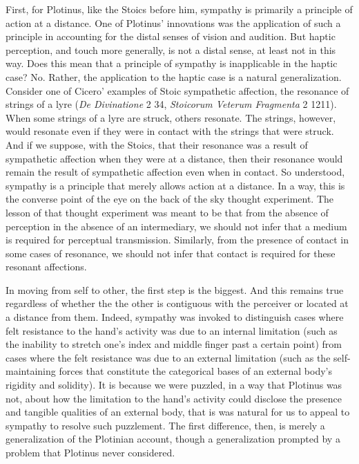 First, for Plotinus, like the Stoics before him, sympathy is primarily a principle of action at a distance. One of Plotinus' innovations was the application of such a principle in accounting for the distal senses of vision and audition. But haptic perception, and touch more generally, is not a distal sense, at least not in this way. Does this mean that a principle of sympathy is inapplicable in the haptic case? No. Rather, the application to the haptic case is a natural generalization. Consider one of Cicero' examples of Stoic sympathetic affection, the resonance of strings of a lyre (\emph{De Divinatione} 2 34, \emph{Stoicorum Veterum Fragmenta} 2 1211). When some strings of a lyre are struck, others resonate. The strings, however, would resonate even if they were in contact with the strings that were struck. And if we suppose, with the Stoics, that their resonance was a result of sympathetic affection when they were at a distance, then their resonance would remain the result of sympathetic affection even when in contact. So understood, sympathy is a principle that merely allows action at a distance. In a way, this is the converse point of the eye on the back of the sky thought experiment. The lesson of that thought experiment was meant to be that from the absence of perception in the absence of an intermediary, we should not infer that a medium is required for perceptual transmission. Similarly, from the presence of contact in some cases of resonance, we should not infer that contact is required for these resonant affections.

In moving from self to other, the first step is the biggest. And this remains true regardless of whether the the other is contiguous with the perceiver or located at a distance from them. Indeed, sympathy was invoked to distinguish cases where felt resistance to the hand's activity was due to an internal limitation (such as the inability to stretch one's index and middle finger past a certain point) from cases where the felt resistance was due to an external limitation (such as the self-maintaining forces that constitute the categorical bases of an external body's rigidity and solidity). It is because we were puzzled, in a way that Plotinus was not, about how the limitation to the hand's activity could disclose the presence and tangible qualities of an external body, that is was natural for us to appeal to sympathy to resolve such puzzlement. The first difference, then, is merely a generalization of the Plotinian account, though a generalization prompted by a problem that Plotinus never considered.

